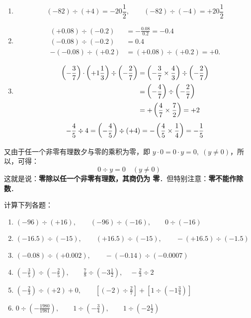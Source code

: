\begin{solution}
    \begin{enumerate}
        \item \[
    (-82)\div (+4)=-20\frac{1}{2},\qquad
    (-82)\div (-4)=+20\frac{1}{2}
\]
         \item \[\begin{split}
    (+0.08)\div (-0.2)&=-\frac{0.08}{0.2}=-0.4\\
    (-0.08)\div (-0.2)&=0.4\\
    -(-0.08)\div (+0.2)&=(+0.08)\div (+0.2)=+0.
\end{split}\]
          \item  \[\begin{split}
    \left(-\dfrac{3}{7}\right)\cdot \left(+1\dfrac{1}{3}\right)\div \left(-\dfrac{2}{7}\right)&= \left(-\dfrac{3}{7}\times\dfrac{4}{3}\right) \div \left(-\dfrac{2}{7}\right)\\
    &=\left(-\dfrac{4}{7}\right)\div \left(-\dfrac{2}{7}\right)\\
    &=+\left(\dfrac{4}{7}\times\dfrac{7}{2}\right)=+2
\end{split}\]
          \[-\dfrac{4}{5}\div 4=\left(-\dfrac{4}{5}\right)\div (+4)=-\left(\dfrac{4}{5}\times\dfrac{1}{4}\right)=-\dfrac{1}{5} \]

    \end{enumerate}
\end{solution}



又由于任一个非零有理数夕与零的乘积为零，即
$y\cdot 0=0\cdot y=0,\; (y\ne 0)$，所以，可得：
              \[0\div y=0\quad  (y\ne 0)\]
    这就是说：\textbf{零除以任一个非零有理数，其商仍为
零}．但特别注意：\textbf{零不能作除数}．


\begin{ex}
计算下列各题：
\begin{enumerate}
    \item $(-96)\div (+16),\qquad (-96)\div (-16),\qquad 0\div (-16)$
    \item $(-16.5)\div (-15),\qquad (+16.5)\div (-15),\qquad -(+16.5)\div (-1.5)$
    \item $(-0.08)\div(+0.002),\qquad -(-0.14)\div (-0.0007)$
    \item $\left(-\frac{3}{5}\right)\div \left(-\frac{2}{5}\right),\qquad \frac{7}{8}\div \left(-3\frac{1}{2}\right),\quad -\frac{2}{3}\div 2$
    \item $\left(-\frac{2}{3}\right)\div (+2) +0,\qquad \left[(-2)\div \frac{2}{7}\right]+\left[1\div\left(-1\frac{3}{4}\right)\right]$
    \item $0\div \left(-\frac{1980}{1981}\right),\qquad 1\div\left(-\frac{3}{4}\right),\qquad 1\div\left(-2\frac{1}{2}\right)$
\end{enumerate}
\end{ex}

